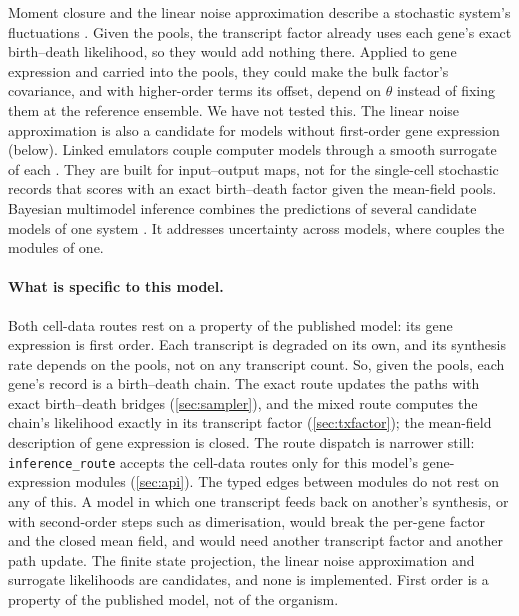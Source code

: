 Moment closure and the linear noise approximation describe a stochastic system's fluctuations
\cite{vankampen2007stochastic,schnoerr2017approximation}. Given the pools, the transcript
factor already uses each gene's exact birth--death likelihood, so they would add nothing there.
Applied to gene expression and carried into the pools, they could make the bulk factor's
covariance, and with higher-order terms its offset, depend on $\theta$ instead of fixing them at the reference ensemble. We have not tested
this. The linear noise approximation is also a candidate for models without first-order gene
expression (below). Linked emulators couple computer models through a smooth surrogate of each
\cite{kyzyurova2018coupling,ming2021linked}. They are built for input--output maps, not for the
single-cell stochastic records that \IC{} scores with an exact birth--death factor given the
mean-field pools. Bayesian multimodel inference combines the predictions of several candidate
models of one system \cite{lindensantangeli2025increasing}. It addresses uncertainty across
models, where \IC{} couples the modules of one.

\paragraph{What is specific to this model.} Both cell-data routes rest on a property of the
published model: its gene expression is first order. Each transcript is degraded on its own,
and its synthesis rate depends on the pools, not on any transcript count. So, given the
pools, each gene's record is a birth--death chain. The exact route updates the paths with
exact birth--death bridges (\cref{sec:sampler}), and the mixed route computes the chain's
likelihood exactly in its transcript factor (\cref{sec:txfactor}); the mean-field
description of gene expression is closed. The route dispatch is narrower still:
\texttt{inference\_route} accepts the cell-data routes only for this model's gene-expression
modules (\cref{sec:api}). The typed edges between modules do not rest on any of this. A
model in which one transcript feeds back on another's synthesis, or with second-order steps
such as dimerisation, would break the per-gene factor and the closed mean field, and would
need another transcript factor and another path update. The finite
state projection, the linear noise approximation and surrogate likelihoods are candidates,
and none is implemented. First order is a property of the published model, not of the
organism.

